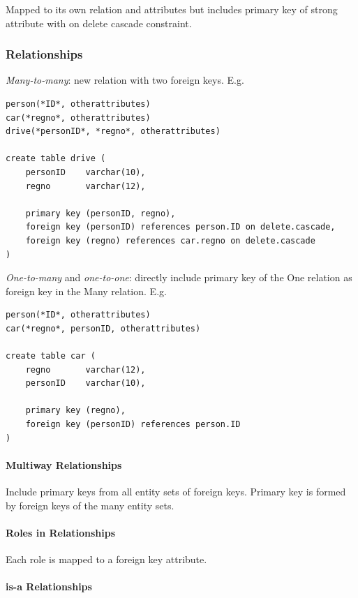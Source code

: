 \documentclass[twocolumn,english]{article}
\begin{document}
Mapped to its own relation and attributes but includes primary key
of strong attribute with on delete cascade constraint.

\subsubsection{Relationships}

\emph{Many-to-many}: new relation with two foreign keys. E.g.

\begin{lstlisting}
person(*ID*, otherattributes)
car(*regno*, otherattributes)
drive(*personID*, *regno*, otherattributes)

create table drive (
	personID    varchar(10),
	regno       varchar(12),

	primary key (personID, regno),
	foreign key (personID) references person.ID on delete.cascade,
	foreign key (regno) references car.regno on delete.cascade
)
\end{lstlisting}


\noindent \emph{One-to-many} and \emph{one-to-one}: directly include
primary key of the One relation as foreign key in the Many relation.
E.g.

\begin{lstlisting}
person(*ID*, otherattributes)
car(*regno*, personID, otherattributes)

create table car (
	regno       varchar(12),
	personID    varchar(10),

	primary key (regno),
	foreign key (personID) references person.ID
)
\end{lstlisting}



\paragraph{Multiway Relationships}

Include primary keys from all entity sets of foreign keys. Primary
key is formed by foreign keys of the many entity sets.


\paragraph{Roles in Relationships}

Each role is mapped to a foreign key attribute.


\paragraph{is-a Relationships}
\end{document}
